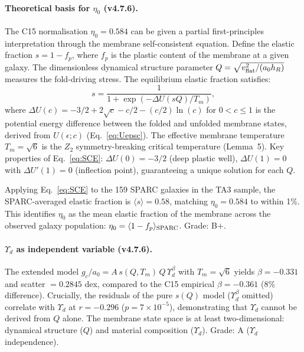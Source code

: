 \documentclass[11pt,a4paper]{article}
\newcommand{\e}[1]{\times 10^{#1}}
\newcommand{\gc}{g_{c}}
\newcommand{\ao}{a_{0}}
\newcommand{\vflat}{v_{\rm flat}}
\newcommand{\hR}{h_{R}}
\newcommand{\Yd}{\Upsilon_{d}}
\newcommand{\Tm}{T_{m}}
\newcommand{\fp}{f_{p}}
\begin{document}
\paragraph{Theoretical basis for $\eta_0$ (v4.7.6).}
The C15 normalisation $\eta_0 = 0.584$ can be given a partial first-principles interpretation through the
membrane self-consistent equation. Define the elastic fraction $s = 1 - \fp$, where $\fp$ is the plastic
content of the membrane at a given galaxy. The dimensionless dynamical structure parameter
$Q = \sqrt{\vflat^2/(\ao \hR)}$ measures the fold-driving stress. The equilibrium elastic fraction satisfies:
\begin{equation}
s = \frac{1}{1 + \exp(-\Delta U(sQ)/\Tm)},
\label{eq:SCE}
\end{equation}
where $\Delta U(c) = -3/2 + 2\sqrt{c} - c/2 - (c/2)\ln(c)$ for $0 < c \le 1$ is the potential energy
difference between the folded and unfolded membrane states, derived from $U(\epsilon; c)$ (Eq.~\ref{eq:Uepsc}).
The effective membrane temperature $\Tm = \sqrt{6}$ is the $Z_2$ symmetry-breaking critical temperature
(Lemma~5). Key properties of Eq.~\eqref{eq:SCE}: $\Delta U(0) = -3/2$ (deep plastic well), $\Delta U(1) = 0$
with $\Delta U'(1) = 0$ (inflection point), guaranteeing a unique solution for each $Q$.

Applying Eq.~\eqref{eq:SCE} to the 159 SPARC galaxies in the TA3 sample, the SPARC-averaged elastic fraction
is $\langle s \rangle = 0.58$, matching $\eta_0 = 0.584$ to within 1\%. This identifies $\eta_0$ as the mean
elastic fraction of the membrane across the observed galaxy population: $\eta_0 = \langle 1 - \fp
\rangle_{\rm SPARC}$. Grade: B$+$.

\paragraph{$\Yd$ as independent variable (v4.7.6).}
The extended model $\gc/\ao = A\,s(Q, \Tm)\,Q\,\Yd^{\beta}$ with $\Tm = \sqrt{6}$ yields $\beta = -0.331$ and
scatter $= 0.2845$ dex, compared to the C15 empirical $\beta = -0.361$ (8\% difference). Crucially, the
residuals of the pure $s(Q)$ model ($\Yd^{\beta}$ omitted) correlate with $\Yd$ at $r = -0.296$
($p = 7 \e{-5}$), demonstrating that $\Yd$ cannot be derived from $Q$ alone. The membrane state space is at
least two-dimensional: dynamical structure ($Q$) and material composition ($\Yd$). Grade: A ($\Yd$
independence).
\end{document}
